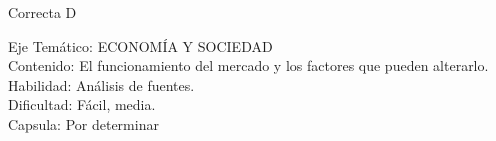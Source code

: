 \documentclass[letterpaper,11pt]{article}
\newcommand{\anchopregunta}{0.9\textwidth}
\begin{document}
\begin{enumerate}
\begin{minipage}{\anchopregunta}
\begin{hint}
\end{hint}
\begin{answer} Correcta D\\
\end{answer}
\begin{info} %
\begin{flushleft}
Eje Temático: ECONOMÍA Y SOCIEDAD\\
Contenido: El funcionamiento del mercado y los factores que pueden alterarlo.\\
Habilidad: Análisis de fuentes.\\
Dificultad: Fácil, media.\\
Capsula: Por determinar \\
\end{flushleft} 
\end{info}
\end{minipage}\vfill$\;$ %


\end{enumerate}
\end{document}
